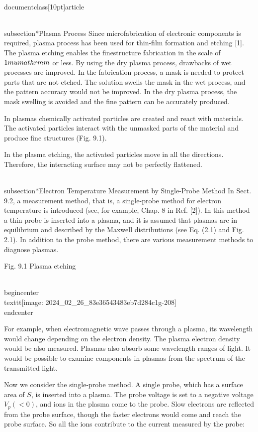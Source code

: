 \\documentclass[10pt]{article}
\begin{document}
{{{{{\\subsection*{Plasma Process}
Since microfabrication of electronic components is required, plasma process has been used for thin-film formation and etching [1]. The plasma etching enables the finestructure fabrication in the scale of $1 \\mu \\mathrm{m}$ or less. By using the dry plasma process, drawbacks of wet processes are improved. In the fabrication process, a mask is needed to protect parts that are not etched. The solution swells the mask in the wet process, and the pattern accuracy would not be improved. In the dry plasma process, the mask swelling is avoided and the fine pattern can be accurately produced.

In plasmas chemically activated particles are created and react with materials. The activated particles interact with the unmasked parts of the material and produce fine structures (Fig. 9.1).

In the plasma etching, the activated particles move in all the directions. Therefore, the interacting surface may not be perfectly flattened.

\\subsection*{Electron Temperature Measurement by Single-Probe Method}
In Sect. 9.2, a measurement method, that is, a single-probe method for electron temperature is introduced (see, for example, Chap. 8 in Ref. [2]). In this method a thin probe is inserted into a plasma, and it is assumed that plasmas are in equilibrium and described by the Maxwell distributions (see Eq. (2.1) and Fig. 2.1). In addition to the probe method, there are various measurement methods to diagnose plasmas.

Fig. 9.1 Plasma etching

\\begin{center}
\\texttt{[image: 2024\_02\_26\_83e36543483eb7d284c1g-208]}
\\end{center}

For example, when electromagnetic wave passes through a plasma, its wavelength would change depending on the electron density. The plasma electron density would be also measured. Plasmas also absorb some wavelength ranges of light. It would be possible to examine components in plasmas from the spectrum of the transmitted light.

Now we consider the single-probe method. A single probe, which has a surface area of $S$, is inserted into a plasma. The probe voltage is set to a negative voltage $V_{p}(<0)$, and ions in the plasma come to the probe. Slow electrons are reflected from the probe surface, though the faster electrons would come and reach the probe surface. So all the ions contribute to the current measured by the probe:


}}}}}
\end{document}
